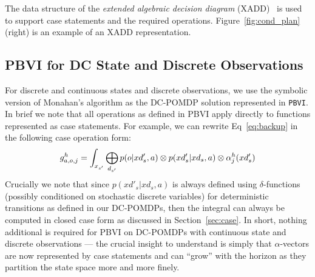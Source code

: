 \documentclass{article} %
\begin{document}
The data structure of the \emph{extended algebraic decision diagram}
(XADD)~\cite{sanner_uai11} is used to support case statements and the
required operations.  Figure~\ref{fig:cond_plan} (right) 
is an example of an XADD representation.

\subsection{PBVI for DC State and Discrete Observations} 
\label{sec:disc_obs}

For discrete and continuous states and discrete observations, we use the symbolic version of Monahan's algorithm as the DC-POMDP solution represented in \texttt{PBVI}.  In brief we note that all operations as defined in PBVI apply directly to functions represented as case statements.  For example, we can rewrite
Eq~\eqref{eq:backup} in the following case operation form:
{\footnotesize
\begin{align}
g^h_{a,o,j} =  \int_{x_{s'}} \large \bigoplus_{d_{s'}} p(o|xd'_s,a) \otimes p(xd'_s|xd_s,a) \otimes \alpha^h_j(xd'_s) \nonumber
\end{align}
}
Crucially we note that since $p(xd'_s|xd_s,a)$ is always defined using $\delta$-functions (possibly conditioned on stochastic discrete variables) for deterministic transitions as defined in our DC-POMDPs, then the integral can always be computed in closed case form as discussed in Section~\ref{sec:case}.
In short, nothing additional is required for PBVI on DC-POMDPs
with continuous state and discrete observations --- the crucial insight
to understand is simply that $\alpha$-vectors are now represented by
case statements and can ``grow'' with the horizon as they partition the
state space more and more finely.
\end{document}
